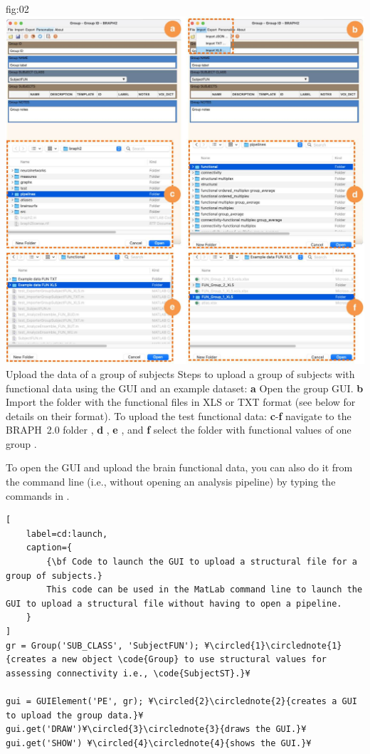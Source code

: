 \documentclass[justified]{tufte-handout}
\begin{document}
	{fig:02}
	{
	\includegraphics{fig02.jpg}
	}
	{Upload the data of a group of subjects}
	{
	Steps to upload a group of subjects with functional data using the GUI and an example dataset: 
	{\bf a} Open the group GUI.
	{\bf b} Import the folder with the functional files in XLS or TXT format (see below for details on their format).
	To upload the test functional data:
	{\bf c}-{\bf f} navigate to the BRAPH~2.0 folder , {\bf d} ,  {\bf e} , and {\bf f} select the folder with functional values of one group .
	}

To open the GUI and upload the brain functional data, you can also do it from the command line (i.e., without opening an analysis pipeline) by typing the commands in .
%
\begin{lstlisting}[
	label=cd:launch,
	caption={
		{\bf Code to launch the GUI to upload a structural file for a group of subjects.}
		This code can be used in the MatLab command line to launch the GUI to upload a structural file without having to open a pipeline.
	}
]
gr = Group('SUB_CLASS', 'SubjectFUN'); ¥\circled{1}\circlednote{1}{creates a new object \code{Group} to use structural values for assessing connectivity i.e., \code{SubjectST}.}¥

gui = GUIElement('PE', gr); ¥\circled{2}\circlednote{2}{creates a GUI to upload the group data.}¥
gui.get('DRAW')¥\circled{3}\circlednote{3}{draws the GUI.}¥
gui.get('SHOW') ¥\circled{4}\circlednote{4}{shows the GUI.}¥
\end{lstlisting}
\end{document}

